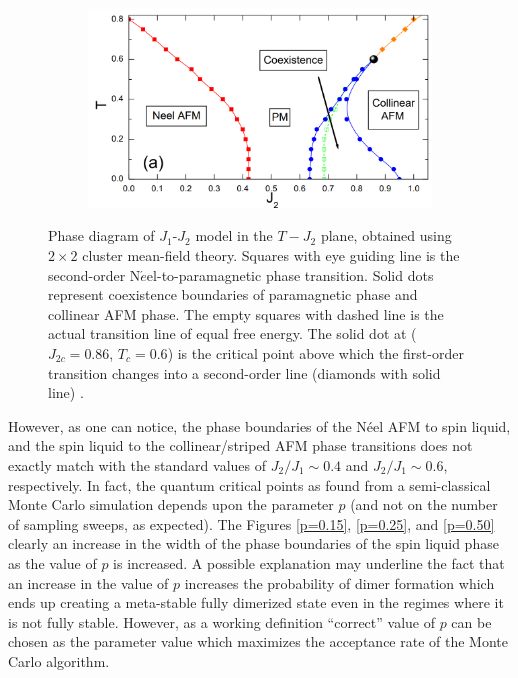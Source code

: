 \documentclass[../thesis_main.tex]{subfiles}
\begin{document}
\begin{figure}[!htb]
    \centering
    \begin{subfigure}[b]{0.6\textwidth}  %
        \centering
        \includegraphics[width=\textwidth]{images/j1-j2/CMFT_diagram.png}
    \end{subfigure}
    \caption{Phase diagram of $J_{1}$-$J_{2}$ model in the $T-J_{2}$ plane, obtained
    using $2 \times 2$ cluster mean-field theory. Squares with eye
    guiding line is the second-order N$\acute{e}$el-to-paramagnetic phase transition.
    Solid dots represent coexistence boundaries of paramagnetic phase and
    collinear AFM phase. The empty squares with dashed line is the actual transition line
    of equal free energy. The solid dot at ($J_{2c}=0.86$, $T_{c}=0.6$) is the critical point above which the
  first-order transition changes into a second-order line (diamonds
  with solid line) \cite{Ren_2014}.}
    \label{CMFT}
\end{figure}
\FloatBarrier \!\!\!\!\!\!\!\!\!\!\!
However, as one can notice, the phase boundaries of the Néel AFM to spin liquid, and the spin liquid to the collinear/striped AFM phase transitions does not exactly match with the standard values of $J_2/J_1 \sim 0.4$ and $J_2/J_1 \sim 0.6$, respectively. In fact, the quantum critical points as found from a semi-classical Monte Carlo simulation depends upon the parameter $p$ (and not on the number of sampling sweeps, as expected). The Figures \ref{p=0.15}, \ref{p=0.25}, and \ref{p=0.50} clearly an increase in the width of the phase boundaries of the spin liquid phase as the value of $p$ is increased. A possible explanation may underline the fact that an increase in the value of $p$ increases the probability of dimer formation which ends up creating a meta-stable fully dimerized state even in the regimes where it is not fully stable. However, as a working definition ``correct'' value of $p$ can be chosen as the parameter value which maximizes the acceptance rate of the Monte Carlo algorithm.
\end{document}
